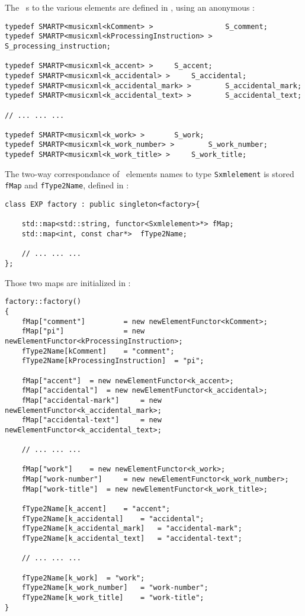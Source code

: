 The \smart\ s to the various elements are defined in , using an anonymous \enumType:
\begin{lstlisting}[language=CPlusPlus]
typedef SMARTP<musicxml<kComment> >					S_comment;
typedef SMARTP<musicxml<kProcessingInstruction> >	S_processing_instruction;

typedef SMARTP<musicxml<k_accent> >		S_accent;
typedef SMARTP<musicxml<k_accidental> >		S_accidental;
typedef SMARTP<musicxml<k_accidental_mark> >		S_accidental_mark;
typedef SMARTP<musicxml<k_accidental_text> >		S_accidental_text;

// ... ... ...

typedef SMARTP<musicxml<k_work> >		S_work;
typedef SMARTP<musicxml<k_work_number> >		S_work_number;
typedef SMARTP<musicxml<k_work_title> >		S_work_title;
\end{lstlisting}

The two-way correspondance of \mxml\ elements names to type {\tt Sxmlelement} is stored {\tt fMap} and {\tt fType2Name}, defined in :
\begin{lstlisting}[language=CPlusPlus]
class EXP factory : public singleton<factory>{

	std::map<std::string, functor<Sxmlelement>*> fMap;
	std::map<int, const char*>	fType2Name;

	// ... ... ...
};
\end{lstlisting}

Those two maps are initialized in :
\begin{lstlisting}[language=CPlusPlus]
factory::factory()
{
	fMap["comment"] 		= new newElementFunctor<kComment>;
	fMap["pi"] 				= new newElementFunctor<kProcessingInstruction>;
	fType2Name[kComment] 	= "comment";
	fType2Name[kProcessingInstruction]  = "pi";

	fMap["accent"] 	= new newElementFunctor<k_accent>;
	fMap["accidental"] 	= new newElementFunctor<k_accidental>;
	fMap["accidental-mark"] 	= new newElementFunctor<k_accidental_mark>;
	fMap["accidental-text"] 	= new newElementFunctor<k_accidental_text>;

	// ... ... ...

	fMap["work"] 	= new newElementFunctor<k_work>;
	fMap["work-number"] 	= new newElementFunctor<k_work_number>;
	fMap["work-title"] 	= new newElementFunctor<k_work_title>;

	fType2Name[k_accent] 	= "accent";
	fType2Name[k_accidental] 	= "accidental";
	fType2Name[k_accidental_mark] 	= "accidental-mark";
	fType2Name[k_accidental_text] 	= "accidental-text";

	// ... ... ...

	fType2Name[k_work] 	= "work";
	fType2Name[k_work_number] 	= "work-number";
	fType2Name[k_work_title] 	= "work-title";
}
\end{lstlisting}

